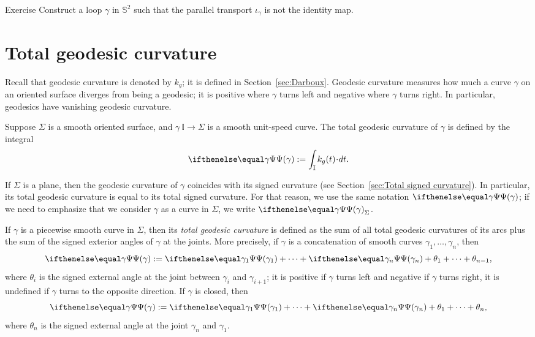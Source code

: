 \begin{thm}{Exercise}\label{ex:holonomy=not0}
Construct a loop $\gamma$ in $\mathbb{S}^2$ such that the parallel transport $\iota_\gamma$ is not the identity map.
\end{thm}

\section{Total geodesic curvature}

Recall that geodesic curvature is denoted by $k_g$;
it is defined in Section~\ref{sec:Darboux}.
Geodesic curvature measures how much a curve $\gamma$ on an oriented surface diverges from being a geodesic;
it is positive where $\gamma$ turns left and negative where $\gamma$ turns right.
In particular, geodesics have vanishing geodesic curvature.

Suppose $\Sigma$ is a smooth oriented surface, and $\gamma\:\mathbb{I}\to \Sigma$ is a smooth unit-speed curve.
The total geodesic curvature of $\gamma$ is defined by the integral 
\[\tgc\gamma
\df
\int_{\mathbb{I}} k_g(t)\cdot dt.\]

If $\Sigma$ is a plane, then the geodesic curvature of $\gamma$ coincides
with its signed curvature (see Section~\ref{sec:Total signed curvature}). 
In particular, its total geodesic curvature is equal to its total signed curvature.
For that reason, we use the same notation $\tgc\gamma$; if we need to emphasize that we consider $\gamma$ as a curve in $\Sigma$, we write $\tgc\gamma_\Sigma$.

If $\gamma$ is a piecewise smooth curve in $\Sigma$, then
its \emph{total geodesic curvature} is defined as the sum of all total geodesic curvatures of its arcs plus the sum of the signed exterior angles of $\gamma$ at the joints.
More precisely, if $\gamma$ is a concatenation of smooth curves $\gamma_1,\dots,\gamma_n$, then
\[\tgc\gamma
\df
\tgc{\gamma_1}+\dots+\tgc{\gamma_n}+\theta_1+\dots+\theta_{n-1},\]
where $\theta_i$ is the signed external angle at the joint between $\gamma_i$ and $\gamma_{i+1}$;
it is positive if $\gamma$ turns left and negative if $\gamma$ turns right, it is undefined if $\gamma$ turns to the opposite direction.
If $\gamma$ is closed, then 
\[\tgc\gamma
\df
\tgc{\gamma_1}+\dots+\tgc{\gamma_n}+\theta_1+\dots+\theta_n,\]
where $\theta_n$ is the signed external angle at the joint $\gamma_n$ and $\gamma_1$.

